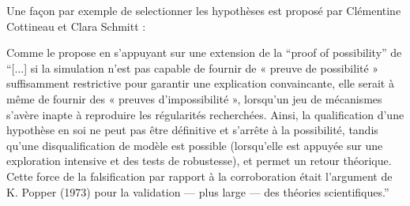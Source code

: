 Une façon par exemple de selectionner les hypothèses est proposé par Clémentine Cottineau et Clara Schmitt : 

Comme le propose \textcite[300]{Cottineau2014b} en s'appuyant sur une extension de la \foreignquote{english}{proof of possibility} de \textcite{Marchionni2013} \enquote{[...] si la simulation n’est pas capable de fournir de « preuve de possibilité » suffisamment restrictive pour garantir une explication convaincante, elle serait à même de fournir des « preuves d’impossibilité », lorsqu’un jeu de mécanismes s’avère inapte à reproduire les régularités recherchées. Ainsi, la qualification d’une hypothèse en soi ne peut pas être définitive et s’arrête à la possibilité, tandis qu’une disqualification de modèle est possible (lorsqu’elle est appuyée sur une exploration intensive et des tests de robustesse), et permet un retour théorique. Cette force de la falsification par rapport à la corroboration était l’argument de K. Popper (1973) pour la validation — plus large — des théories scientifiques.}



